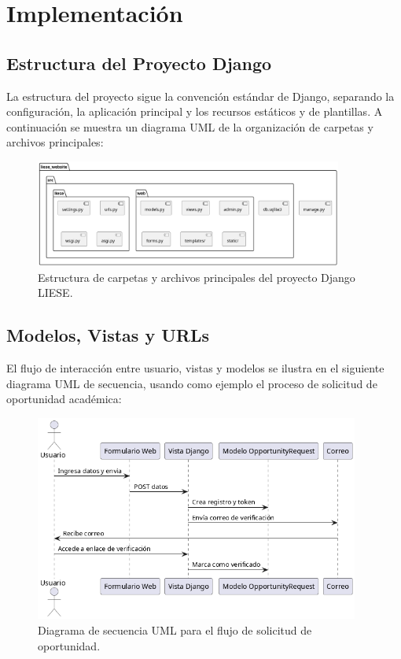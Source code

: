 \chapter{Implementación}
\section{Estructura del Proyecto Django}
La estructura del proyecto sigue la convención estándar de Django, separando la configuración, la aplicación principal y los recursos estáticos y de plantillas. A continuación se muestra un diagrama UML de la organización de carpetas y archivos principales:
\begin{figure}[H]
	\centering
	\includegraphics[width=0.9\textwidth]{uml/estructura-proyecto.png}
	\caption{Estructura de carpetas y archivos principales del proyecto Django LIESE.}
\end{figure}
\newpage
\section{Modelos, Vistas y URLs}
El flujo de interacción entre usuario, vistas y modelos se ilustra en el siguiente diagrama UML de secuencia, usando como ejemplo el proceso de solicitud de oportunidad académica:
\begin{figure}[H]
	\centering
	\includegraphics[width=0.95\textwidth]{uml/flujo-oportunidad.png}
	\caption{Diagrama de secuencia UML para el flujo de solicitud de oportunidad.}
\end{figure}
